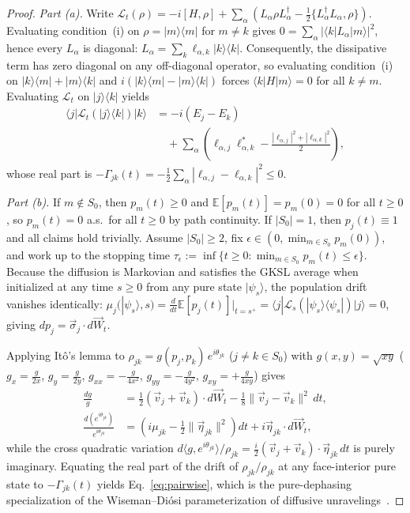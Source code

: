 \documentclass[aps,pra,10pt,twocolumn,superscriptaddress,amsmath,amssymb,floatfix]{revtex4-2}
\newcommand{\E}{\mathbb{E}}
\newcommand{\ket}[1]{|#1\rangle}
\newcommand{\bra}[1]{\langle #1|}
\newcommand{\ketbra}[2]{|#1\rangle\langle #2|}
\begin{document}
\begin{proof}
\emph{Part (a).} Write $\mathcal{L}_t(\rho) = -i[H,\rho] + \sum_\alpha (L_\alpha\rho L_\alpha^\dagger - \frac{1}{2}\{L_\alpha^\dagger L_\alpha,\rho\})$. Evaluating condition~(i) on $\rho = \ketbra{m}{m}$ for $m \ne k$ gives $0 = \sum_\alpha |\bra{k}L_\alpha\ket{m}|^2$, hence every $L_\alpha$ is diagonal: $L_\alpha = \sum_k \ell_{\alpha,k}\ketbra{k}{k}$. Consequently, the dissipative term has zero diagonal on any off-diagonal operator, so evaluating condition~(i) on $\ketbra{k}{m}+\ketbra{m}{k}$ and $i(\ketbra{k}{m}-\ketbra{m}{k})$ forces $\bra{k}H\ket{m}=0$ for all $k\ne m$. Evaluating $\mathcal{L}_t$ on $\ketbra{j}{k}$ yields
\begin{align*}
\bra{j}\mathcal{L}_t(\ketbra{j}{k})\ket{k}
&= -i(E_j-E_k) \\
&\quad + \sum_\alpha\!\left(\ell_{\alpha,j}\ell_{\alpha,k}^* - \frac{|\ell_{\alpha,j}|^2 + |\ell_{\alpha,k}|^2}{2}\right),
\end{align*}
whose real part is $-\Gamma_{jk}(t) = -\frac{1}{2}\sum_\alpha |\ell_{\alpha,j}-\ell_{\alpha,k}|^2 \le 0$.

\emph{Part (b).} If $m \notin S_0$, then $p_m(t) \ge 0$ and $\E[p_m(t)] = p_m(0) = 0$ for all $t \ge 0$, so $p_m(t) = 0$ a.s.\ for all $t \ge 0$ by path continuity. If $|S_0| = 1$, then $p_j(t) \equiv 1$ and all claims hold trivially. Assume $|S_0| \ge 2$, fix $\epsilon \in (0, \min_{m \in S_0} p_m(0))$, and work up to the stopping time $\tau_\epsilon := \inf\{t \ge 0 : \min_{m \in S_0} p_m(t) \le \epsilon\}$. Because the diffusion is Markovian and satisfies the GKSL average when initialized at any time $s \ge 0$ from any pure state $\ket{\psi_s}$, the population drift vanishes identically: $\mu_j(\ket{\psi_s},s) = \frac{d}{dt}\E[p_j(t)]\big|_{t=s^+} = \bra{j}\mathcal{L}_s(\ketbra{\psi_s}{\psi_s})\ket{j} = 0$, giving $dp_j = \vec{\sigma}_j\cdot d\vec{W}_t$.

Applying It\^o's lemma to $\rho_{jk} = g(p_j,p_k)\,e^{i\theta_{jk}}$ ($j \ne k \in S_0$) with $g(x,y)=\sqrt{xy}$ ($g_x = \frac{g}{2x}$, $g_y = \frac{g}{2y}$, $g_{xx} = -\frac{g}{4x^2}$, $g_{yy} = -\frac{g}{4y^2}$, $g_{xy} = +\frac{g}{4xy}$) gives
\begin{align*}
\frac{dg}{g} &= \frac{1}{2}(\vec{v}_j+\vec{v}_k)\cdot d\vec{W}_t - \frac{1}{8}\|\vec{v}_j - \vec{v}_k\|^2\,dt, \\
\frac{d(e^{i\theta_{jk}})}{e^{i\theta_{jk}}} &= \left(i\mu_{jk} - \frac{1}{2}\|\vec{\eta}_{jk}\|^2\right)dt + i\vec{\eta}_{jk}\cdot d\vec{W}_t,
\end{align*}
while the cross quadratic variation $d\langle g, e^{i\theta_{jk}}\rangle / \rho_{jk} = \frac{i}{2}(\vec{v}_j+\vec{v}_k)\cdot\vec{\eta}_{jk}\,dt$ is purely imaginary. Equating the real part of the drift of $\rho_{jk}/\rho_{jk}$ at any face-interior pure state to $-\Gamma_{jk}(t)$ yields Eq.~\eqref{eq:pairwise}, which is the pure-dephasing specialization of the Wiseman--Di\'osi parameterization of diffusive unravelings~\cite{WisemanDiosi2001}.


\end{proof}
\end{document}
